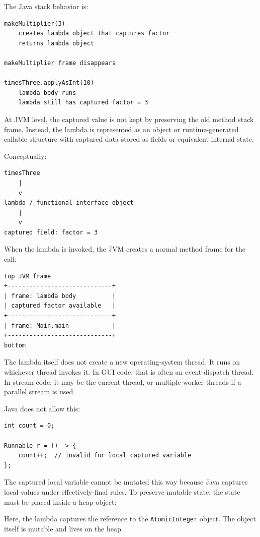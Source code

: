 The Java stack behavior is:

\begin{verbatim}
makeMultiplier(3)
    creates lambda object that captures factor
    returns lambda object

makeMultiplier frame disappears

timesThree.applyAsInt(10)
    lambda body runs
    lambda still has captured factor = 3
\end{verbatim}

At JVM level, the captured value is not kept by preserving the old method stack frame. Instead, the lambda is represented as an object or runtime-generated callable structure with captured data stored as fields or equivalent internal state.

Conceptually:

\begin{verbatim}
timesThree
    |
    v
lambda / functional-interface object
    |
    v
captured field: factor = 3
\end{verbatim}

When the lambda is invoked, the JVM creates a normal method frame for the call:

\begin{verbatim}
top JVM frame
+-----------------------------+
| frame: lambda body          |
| captured factor available   |
+-----------------------------+
| frame: Main.main            |
+-----------------------------+
bottom
\end{verbatim}

The lambda itself does not create a new operating-system thread. It runs on whichever thread invokes it. In GUI code, that is often an event-dispatch thread. In stream code, it may be the current thread, or multiple worker threads if a parallel stream is used.

Java does not allow this:

\begin{verbatim}
int count = 0;

Runnable r = () -> {
    count++;  // invalid for local captured variable
};
\end{verbatim}

The captured local variable cannot be mutated this way because Java captures local values under effectively-final rules. To preserve mutable state, the state must be placed inside a heap object:

Here, the lambda captures the reference to the \texttt{AtomicInteger} object. The object itself is mutable and lives on the heap.

